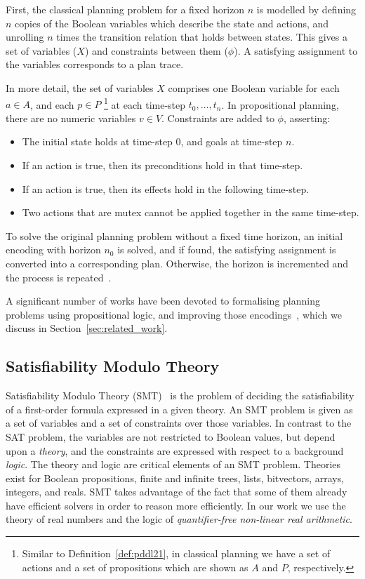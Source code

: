 First, the classical planning problem for a fixed horizon $n$ is modelled by defining $n$ copies of the Boolean variables which describe the state and actions, and unrolling $n$ times the transition relation that holds between states. This gives a set of variables ($X$) and constraints between them ($\phi$). A satisfying assignment to the variables corresponds to a plan trace.

In more detail, the set of variables $X$ comprises one Boolean variable for each $a\in A$, and each $p\in P$ \footnote{Similar to Definition~\ref{def:pddl21}, in classical planning we have a set of actions and a set of propositions which are shown as $A$ and $P$, respectively.} at each time-step $t_0, \ldots, t_n$. In propositional planning, there are no numeric variables $v\in V$. Constraints are added to $\phi$, asserting:
\begin{itemize}
\item The initial state holds at time-step $0$, and goals at time-step $n$.
\item If an action is true, then its preconditions hold in that time-step.
\item If an action is true, then its effects hold in the following time-step.
\item Two actions that are mutex cannot be applied together in the same time-step.
\end{itemize}

To solve the original planning problem without a fixed time horizon, an initial encoding with horizon $n_0$ is solved, and if found, the satisfying assignment is converted into a corresponding plan. Otherwise, the horizon is incremented and the process is repeated~\cite{kau99}.

A significant number of works have been devoted to formalising planning problems using propositional logic, and improving those encodings~\cite{rin06,che07,rob09,rin10,cas12b}, which we discuss in Section~\ref{sec:related_work}.

\subsection{Satisfiability Modulo Theory}

Satisfiability Modulo Theory (SMT)~\cite{bar18} is the problem of deciding the satisfiability of a first-order formula expressed in a given theory. An SMT problem is given as a set of variables and a set of constraints over those variables. In contrast to the SAT problem, the variables are not restricted to Boolean values, but depend upon a \textit{theory}, and the constraints are expressed with respect to a background \textit{logic}.
%
The theory and logic are critical elements of an SMT problem. Theories exist for Boolean propositions, finite and infinite trees, lists, bitvectors, arrays, integers, and reals. SMT takes advantage of the fact that some of them already have efficient solvers in order to reason more efficiently. In our work we use the theory of real numbers and the logic of \textit{quantifier-free non-linear real arithmetic}.

